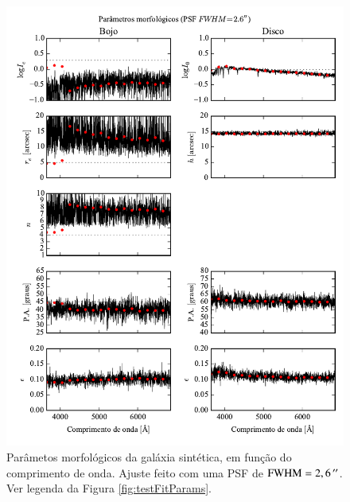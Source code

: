 \begin{figure}
	\includegraphics{figuras/simulation_fitparams_psf26}
	\caption[Parâmetos morfológicos (teste com PSF $\mathrm{FWHM} = 2,6\,\arcs$).]
	{Parâmetos morfológicos da galáxia sintética, em função do comprimento de
	onda. Ajuste feito com uma PSF de $\mathrm{FWHM} = 2,6\,\arcs$. Ver
	legenda da Figura \ref{fig:testFitParams}.}
	\label{fig:testFitParams26}
\end{figure}


